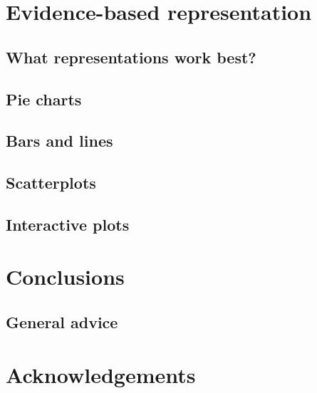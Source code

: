 \section{Evidence-based representation}
\subsection{What representations work best?}

\subsection{Pie charts}

\subsection{Bars and lines}

\subsection{Scatterplots}

\subsection{Interactive plots}


\section{Conclusions}
\subsection{General advice}


\section{Acknowledgements}
%



